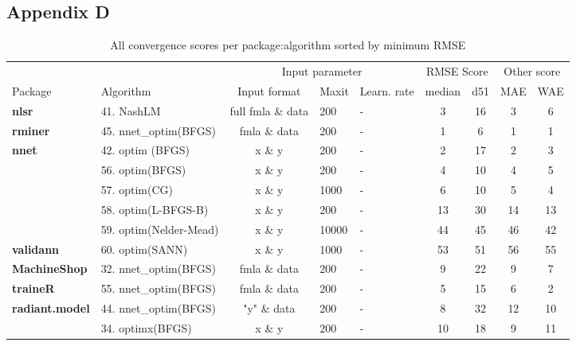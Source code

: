 \hypertarget{appendix-d}{%
\subsection{Appendix D}\label{appendix-d}}

\begin{Schunk}
\begin{table}[!h]

\caption{\label{tab:unnamed-chunk-8}All convergence scores per package:algorithm sorted by minimum RMSE}
\centering
\fontsize{7}{9}\selectfont
\begin{tabular}[t]{>{}llcllcccc}
\toprule
\multicolumn{2}{c}{ } & \multicolumn{3}{c}{Input parameter} & \multicolumn{2}{c}{RMSE Score} & \multicolumn{2}{c}{Other score} \\
\cmidrule(l{3pt}r{3pt}){3-5} \cmidrule(l{3pt}r{3pt}){6-7} \cmidrule(l{3pt}r{3pt}){8-9}
Package & Algorithm & Input format & Maxit & Learn. rate & median & d51 & MAE & WAE\\
\midrule
\textbf{nlsr} & 41. NashLM & full fmla \& data & 200 & - & 3 & 16 & 3 & 6\\
\cmidrule{1-9}
\textbf{rminer} & 45. nnet\_optim(BFGS) & fmla \& data & 200 & - & 1 & 6 & 1 & 1\\
\cmidrule{1-9}
\textbf{nnet} & 42. optim (BFGS) & x \& y & 200 & - & 2 & 17 & 2 & 3\\
\cmidrule{1-9}
 & 56. optim(BFGS) & x \& y & 200 & - & 4 & 10 & 4 & 5\\

 & 57. optim(CG) & x \& y & 1000 & - & 6 & 10 & 5 & 4\\

 & 58. optim(L-BFGS-B) & x \& y & 200 & - & 13 & 30 & 14 & 13\\

 & 59. optim(Nelder-Mead) & x \& y & 10000 & - & 44 & 45 & 46 & 42\\

\multirow{-5}{*}{\raggedright\arraybackslash \textbf{validann}} & 60. optim(SANN) & x \& y & 1000 & - & 53 & 51 & 56 & 55\\
\cmidrule{1-9}
\textbf{MachineShop} & 32. nnet\_optim(BFGS) & fmla \& data & 200 & - & 9 & 22 & 9 & 7\\
\cmidrule{1-9}
\textbf{traineR} & 55. nnet\_optim(BFGS) & fmla \& data & 200 & - & 5 & 15 & 6 & 2\\
\cmidrule{1-9}
\textbf{radiant.model} & 44. nnet\_optim(BFGS) & "y" \& data & 200 & - & 8 & 32 & 12 & 10\\
\cmidrule{1-9}
 & 34. optimx(BFGS) & x \& y & 200 & - & 10 & 18 & 9 & 11\\


\end{tabular}
\end{table}
\end{Schunk}
